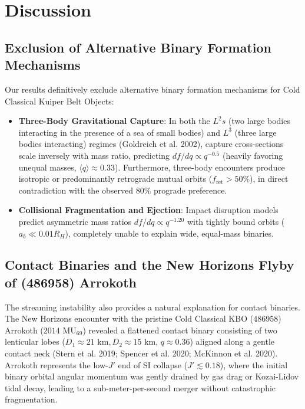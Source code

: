 \documentclass[11pt,a4paper]{article}
\begin{document}
\section{Discussion}
\subsection{Exclusion of Alternative Binary Formation Mechanisms}
Our results definitively exclude alternative binary formation mechanisms for Cold Classical Kuiper Belt Objects:
\begin{itemize}
    \item \textbf{Three-Body Gravitational Capture}: In both the $L^2s$ (two large bodies interacting in the presence of a sea of small bodies) and $L^3$ (three large bodies interacting) regimes (Goldreich et al. 2002), capture cross-sections scale inversely with mass ratio, predicting $df/dq \propto q^{-0.5}$ (heavily favoring unequal masses, $\langle q \rangle \approx 0.33$). Furthermore, three-body encounters produce isotropic or predominantly retrograde mutual orbits ($f_{\text{ret}} > 50\%$), in direct contradiction with the observed $80\%$ prograde preference.
    \item \textbf{Collisional Fragmentation and Ejection}: Impact disruption models predict asymmetric mass ratios $df/dq \propto q^{-1.20}$ with tightly bound orbits ($a_b \ll 0.01 R_H$), completely unable to explain wide, equal-mass binaries.
\end{itemize}

\subsection{Contact Binaries and the New Horizons Flyby of (486958) Arrokoth}
The streaming instability also provides a natural explanation for contact binaries. The New Horizons encounter with the pristine Cold Classical KBO (486958) Arrokoth ($2014\text{ MU}_{69}$) revealed a flattened contact binary consisting of two lenticular lobes ($D_1 \approx 21\text{ km}, D_2 \approx 15\text{ km}$, $q \approx 0.36$) aligned along a gentle contact neck (Stern et al. 2019; Spencer et al. 2020; McKinnon et al. 2020). Arrokoth represents the low-$J'$ end of SI collapse ($J' \lesssim 0.18$), where the initial binary orbital angular momentum was gently drained by gas drag or Kozai-Lidov tidal decay, leading to a sub-meter-per-second merger without catastrophic fragmentation.
\end{document}
